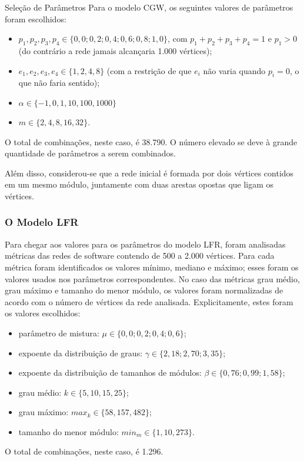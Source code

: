 \begin{section}{Seleção de Parâmetros}
Para o modelo CGW, os seguintes valores de parâmetros foram escolhidos:

\begin{itemize}
	\item $p_1, p_2, p_3, p_4 \in \{0,0; 0,2; 0,4; 0,6; 0,8; 1,0\}$, com $p_1 + p_2 + p_3 + p_4 = 1$ e $p_1 > 0$ (do contrário a rede jamais alcançaria 1.000 vértices);
	\item $e_1, e_2, e_3, e_4 \in \{1, 2, 4, 8\}$ (com a restrição de que $e_i$ não varia quando $p_i = 0$, o que não faria sentido);
	\item $\alpha \in \{-1, 0, 1, 10, 100, 1000\}$
	\item $m \in \{2, 4, 8, 16, 32\}$.
\end{itemize}

O total de combinações, neste caso, é 38.790. O número elevado se deve à grande quantidade de parâmetros a serem combinados.

Além disso, considerou-se que a rede inicial é formada por dois vértices contidos em um mesmo módulo, juntamente com duas arestas opostas que ligam os vértices.

\subsubsection{O Modelo LFR}

Para chegar aos valores para os parâmetros do modelo LFR, foram analisadas métricas das redes de software contendo de 500 a 2.000 vértices. Para cada métrica foram identificados os valores mínimo, mediano e máximo; esses foram os valores usados nos parâmetros correspondentes. No caso das métricas grau médio, grau máximo e tamanho do menor módulo, os valores foram normalizadas de acordo com o número de vértices da rede analisada. Explicitamente, estes foram os valores escolhidos:

\begin{itemize}
	\item parâmetro de mistura: $\mu \in \{0,0; 0,2; 0,4; 0,6\}$;
	\item expoente da distribuição de graus: $\gamma \in \{2,18; 2,70; 3,35\}$;
	\item expoente da distribuição de tamanhos de módulos: $\beta \in \{0,76; 0,99; 1,58\}$;
	\item grau médio: $k \in \{5, 10, 15, 25\}$;
	\item grau máximo: $max_k \in \{58, 157, 482\}$;
	\item tamanho do menor módulo: $min_m \in \{1, 10, 273\}$.
\end{itemize}

O total de combinações, neste caso, é 1.296.


\end{section}

